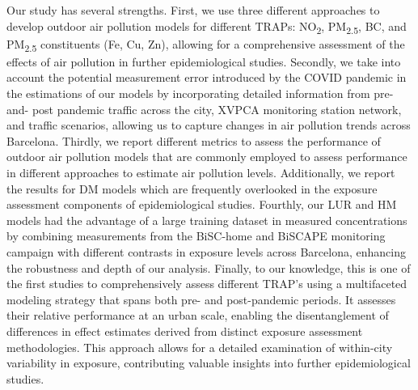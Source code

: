 \documentclass{article}
\begin{document}
Our study has several strengths. First, we use three different approaches to develop outdoor air pollution models for different TRAPs: NO\textsubscript{2}, PM\textsubscript{2.5}, BC, and PM\textsubscript{2.5} constituents (Fe, Cu, Zn), allowing for a comprehensive assessment of the effects of air pollution in further epidemiological studies. Secondly, we take into account the potential measurement error introduced by the COVID pandemic in the estimations of our models by incorporating detailed information from pre-and- post pandemic traffic across the city, XVPCA monitoring station network, and traffic scenarios, allowing us to capture changes in air pollution trends across Barcelona. Thirdly, we report different metrics to assess the performance of outdoor air pollution models that are commonly employed to assess performance in different approaches to estimate air pollution levels. Additionally, we report the results for DM models which are frequently overlooked in the exposure assessment components of epidemiological studies. Fourthly, our LUR and HM models had the advantage of a large training dataset in measured concentrations by combining measurements from the BiSC-home and BiSCAPE monitoring campaign with different contrasts in exposure levels across Barcelona, enhancing the robustness and depth of our analysis. Finally, to our knowledge, this is one of the first studies to comprehensively assess different TRAP's using a multifaceted modeling strategy that spans both pre- and post-pandemic periods. It assesses their relative performance at an urban scale, enabling the disentanglement of differences in effect estimates derived from distinct exposure assessment methodologies. This approach allows for a detailed examination of within-city variability in exposure, contributing valuable insights into further epidemiological studies.\\ 
\end{document}
